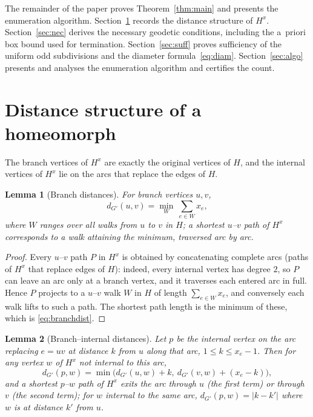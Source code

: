 \documentclass{amsart}
\theoremstyle{plain}
\newtheorem{lemma}{Lemma}
\theoremstyle{definition}
\newcommand{\dG}{d_{G'}}
\begin{document}
The remainder of the paper proves Theorem~\ref{thm:main} and presents the
enumeration algorithm. Section~\ref{sec:dist} records the distance structure of
$H^x$. Section~\ref{sec:nec} derives the necessary geodetic conditions, including
the a~priori box bound used for termination. Section~\ref{sec:suff} proves
sufficiency of the uniform odd subdivisions and the diameter
formula~\eqref{eq:diam}. Section~\ref{sec:algo} presents and analyses the
enumeration algorithm and certifies the count.

\section{Distance structure of a homeomorph}\label{sec:dist}

The branch vertices of $H^x$ are exactly the original vertices of $H$, and the
internal vertices of $H^x$ lie on the arcs that replace the edges of $H$.

\begin{lemma}[Branch distances]\label{lem:branchdist}
For branch vertices $u,v$,
\begin{equation}\label{eq:branchdist}
\dG(u,v)=\min_{W}\ \sum_{e\in W} x_e,
\end{equation}
where $W$ ranges over all walks from $u$ to $v$ in $H$; a shortest $u$--$v$ path of
$H^x$ corresponds to a walk attaining the minimum, traversed arc by arc.
\end{lemma}

\begin{proof}
Every $u$--$v$ path $P$ in $H^x$ is obtained by concatenating complete arcs (paths
of $H^x$ that replace edges of $H$): indeed, every internal vertex has degree $2$,
so $P$ can leave an arc only at a branch vertex, and it traverses each entered arc
in full. Hence $P$ projects to a $u$--$v$ walk $W$ in $H$ of length
$\sum_{e\in W}x_e$, and conversely each walk lifts to such a path. The shortest path
length is the minimum of these, which is \eqref{eq:branchdist}.
\end{proof}

\begin{lemma}[Branch--internal distances]\label{lem:internaldist}
Let $p$ be the internal vertex on the arc replacing $e=uv$ at distance $k$ from $u$
along that arc, $1\le k\le x_e-1$. Then for any vertex $w$ of $H^x$ not internal to
this arc,
\begin{equation}\label{eq:internaldist}
\dG(p,w)=\min\bigl(\dG(u,w)+k,\ \dG(v,w)+(x_e-k)\bigr),
\end{equation}
and a shortest $p$--$w$ path of $H^x$ exits the arc through $u$ (the first term) or
through $v$ (the second term); for $w$ internal to the same arc, $\dG(p,w)=|k-k'|$
where $w$ is at distance $k'$ from $u$.
\end{lemma}
\end{document}
